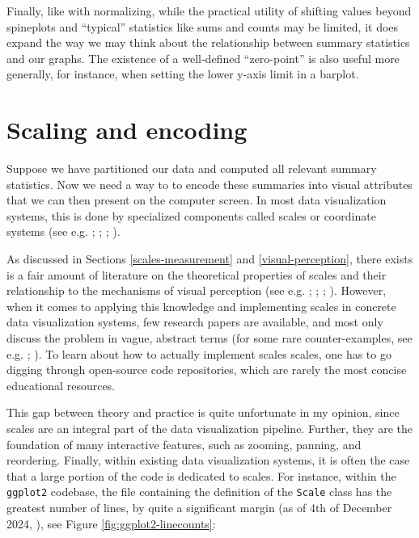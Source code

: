 \documentclass[
  openany]{book}
\theoremstyle{definition}
\theoremstyle{definition}
\theoremstyle{definition}
\theoremstyle{definition}
\theoremstyle{remark}
\begin{document}
Finally, like with normalizing, while the practical utility of shifting values beyond spineplots and ``typical'' statistics like sums and counts may be limited, it does expand the way we may think about the relationship between summary statistics and our graphs. The existence of a well-defined ``zero-point'' is also useful more generally, for instance, when setting the lower y-axis limit in a barplot.

\section{Scaling and encoding}\label{scaling}

Suppose we have partitioned our data and computed all relevant summary statistics. Now we need a way to to encode these summaries into visual attributes that we can then present on the computer screen. In most data visualization systems, this is done by specialized components called scales or coordinate systems (see e.g. ; ; ; ).

As discussed in Sections \ref{scales-measurement} and \ref{visual-perception}, there exists is a fair amount of literature on the theoretical properties of scales and their relationship to the mechanisms of visual perception (see e.g. ; ; ; ). However, when it comes to applying this knowledge and implementing scales in concrete data visualization systems, few research papers are available, and most only discuss the problem in vague, abstract terms (for some rare counter-examples, see e.g. ; ). To learn about how to actually implement scales scales, one has to go digging through open-source code repositories, which are rarely the most concise educational resources.

This gap between theory and practice is quite unfortunate in my opinion, since scales are an integral part of the data visualization pipeline. Further, they are the foundation of many interactive features, such as zooming, panning, and reordering. Finally, within existing data visualization systems, it is often the case that a large portion of the code is dedicated to scales. For instance, within the \texttt{ggplot2} codebase, the file containing the definition of the \texttt{Scale} class has the greatest number of lines, by quite a significant margin (as of 4th of December 2024, ), see Figure \ref{fig:ggplot2-linecounts}:
\end{document}
